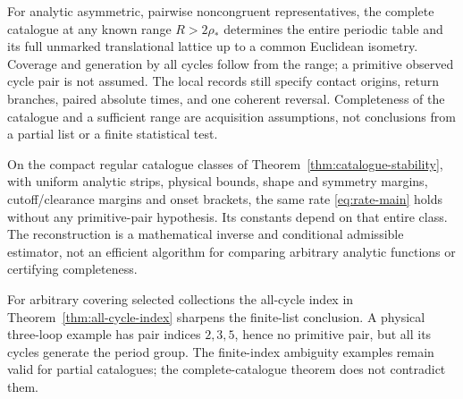 \begin{theorem}\label{thm:canonical-main}
For analytic asymmetric, pairwise noncongruent representatives, the
complete catalogue at any known range $R>2\rho_*$ determines the
entire periodic table and its full unmarked translational lattice up
to a common Euclidean isometry. Coverage and generation by all cycles
follow from the range; a primitive observed cycle pair is not assumed.
The local records still specify contact origins, return branches, paired
absolute times, and one coherent reversal. Completeness of the catalogue
and a sufficient range are acquisition assumptions, not conclusions
from a partial list or a finite statistical test.

On the compact regular catalogue classes of
Theorem~\ref{thm:catalogue-stability}, with uniform analytic strips,
physical bounds, shape and symmetry margins, cutoff/clearance margins
and onset brackets, the same rate \eqref{eq:rate-main} holds without
any primitive-pair hypothesis. Its constants depend on that entire class.
The reconstruction is a mathematical inverse and conditional admissible
estimator, not an efficient algorithm for comparing arbitrary analytic
functions or certifying completeness.
\end{theorem}

For arbitrary covering selected collections the all-cycle index in
Theorem~\ref{thm:all-cycle-index} sharpens the finite-list conclusion.
A physical three-loop example has pair indices $2,3,5$, hence no
primitive pair, but all its cycles generate the period group. The
finite-index ambiguity examples remain valid for partial catalogues;
the complete-catalogue theorem does not contradict them.
